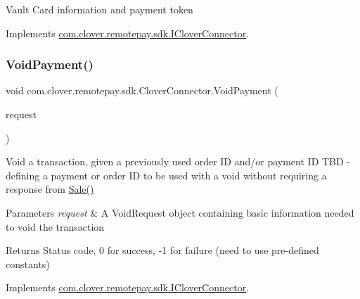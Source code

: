 Vault Card information and payment token 



Implements \hyperlink{interfacecom_1_1clover_1_1remotepay_1_1sdk_1_1_i_clover_connector_a1d501a736452123be1dd8f42157389e3}{com.\+clover.\+remotepay.\+sdk.\+I\+Clover\+Connector}.

\mbox{\label{classcom_1_1clover_1_1remotepay_1_1sdk_1_1_clover_connector_aa987ae8606b8b2f4a235e9c09ffeef3b}} 
\subsubsection{\texorpdfstring{Void\+Payment()}{VoidPayment()}}
{\footnotesize\ttfamily void com.\+clover.\+remotepay.\+sdk.\+Clover\+Connector.\+Void\+Payment (\begin{DoxyParamCaption}\item[{\hyperlink{classcom_1_1clover_1_1remotepay_1_1sdk_1_1_void_payment_request}{Void\+Payment\+Request}}]{request }\end{DoxyParamCaption})}



Void a transaction, given a previously used order ID and/or payment ID T\+BD -\/ defining a payment or order ID to be used with a void without requiring a response from \hyperlink{classcom_1_1clover_1_1remotepay_1_1sdk_1_1_clover_connector_a1adbcc8a0d4aaa82157a102af4f16b91}{Sale()} 


\begin{DoxyParams}{Parameters}
{\em request} & A Void\+Request object containing basic information needed to void the transaction\\
\hline
\end{DoxyParams}
\begin{DoxyReturn}{Returns}
Status code, 0 for success, -\/1 for failure (need to use pre-\/defined constants)
\end{DoxyReturn}


Implements \hyperlink{interfacecom_1_1clover_1_1remotepay_1_1sdk_1_1_i_clover_connector_af35e223ba760d0a6d61c67895c619997}{com.\+clover.\+remotepay.\+sdk.\+I\+Clover\+Connector}.




